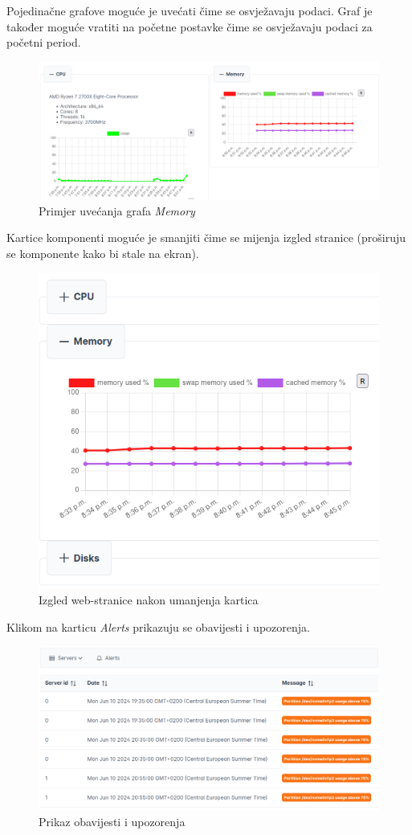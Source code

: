 \documentclass[zavrsnirad]{fer}
\begin{document}
Pojedinačne grafove moguće je uvećati čime se osvježavaju podaci. Graf je također moguće vratiti na početne postavke čime se osvježavaju podaci za početni period.
\begin{figure}[htb]
	\centering
	\includegraphics[width=1\linewidth]{images/web_3.png} 
	\caption{Primjer uvećanja grafa \textit{Memory}}
\end{figure}
\FloatBarrier

Kartice komponenti moguće je smanjiti čime se mijenja izgled stranice (proširuju se komponente kako bi stale na ekran).
\begin{figure}[htb]
	\centering
	\includegraphics[width=0.75\linewidth]{images/web_4.png} 
	\caption{Izgled web-stranice nakon umanjenja kartica}
\end{figure}
\FloatBarrier

Klikom na karticu \textit{Alerts} prikazuju se obavijesti i upozorenja.
\begin{figure}[htb]
	\centering
	\includegraphics[width=1\linewidth]{images/web_5.png} 
	\caption{Prikaz obavijesti i upozorenja}
\end{figure}
\FloatBarrier
\end{document}
